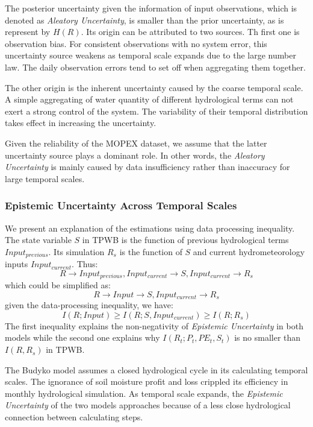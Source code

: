 \documentclass[review]{elsarticle}
\begin{document}
The posterior uncertainty given the information of input observations, which is denoted as \emph{Aleatory Uncertainty}, is smaller than the prior uncertainty, as is represent by $H(R)$. Its origin can be attributed to two sources. Th first one is  observation bias. For consistent observations with no system error, this uncertainty source  weakens as temporal scale expands  due to the large number law. The daily observation errors tend to set off when aggregating them together. 

The other origin is the inherent uncertainty caused by the coarse temporal scale. A simple aggregating of water quantity of different hydrological terms can not exert a strong control of the system. The variability of their temporal distribution takes effect in increasing the uncertainty. 

Given the reliability of the MOPEX dataset, we assume that the latter uncertainty source plays a dominant role. In other words, the \emph{Aleatory Uncertainty} is mainly caused by data insufficiency rather than inaccuracy for large temporal scales. 
\subsubsection{Epistemic Uncertainty Across Temporal Scales}
We present an explanation of the estimations using data processing inequality. The state variable $S$ in TPWB is the function of previous hydrological terms $Input_{previous}$. Its simulation $R_s$ is the function of $S$ and current hydrometeorology inputs $Input_{current}$. Thus:
\begin{equation}
R \rightarrow Input_{previous},Input_{current} \rightarrow S,Input_{current} \rightarrow R_s
\end{equation}
which could be simplified  as:
 \begin{equation}
R \rightarrow Input \rightarrow S,Input_{current} \rightarrow R_s
\end{equation}
given the data-processing inequality, we have:
\begin{equation}
\label{ie2}
I(R;Input)\geq I(R;S,Input_{current}) \geq I(R;R_s)
\end{equation}
The first inequality explains the non-negativity of \emph{Epistemic Uncertainty} in both models while the second one explains why $I(R_t;P_t,PE_t,S_t)$ is no smaller than $I(R,R_s)$ in TPWB.

The Budyko model assumes a closed hydrological cycle in its calculating temporal scales. The ignorance of soil moisture profit and loss crippled its efficiency in monthly hydrological simulation. As temporal scale expands, the \emph{Epistemic Uncertainty} of the two models approaches because of a less close hydrological connection between calculating steps.
\fi
\end{document}
